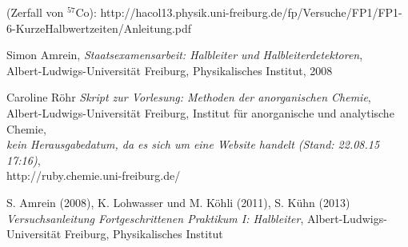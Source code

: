 \documentclass[12pt]{article}
\begin{document}
\newpage
\listoffigures


\newpage
\thispagestyle{empty}
\begin{thebibliography}{9}

 (Zerfall von $^{57}$Co): http://hacol13.physik.uni-freiburg.de/fp/Versuche/FP1/FP1-6-KurzeHalbwertzeiten/Anleitung.pdf
  
  	Simon Amrein,
  	\emph{Staatsexamensarbeit: Halbleiter und Halbleiterdetektoren},\\
  	Albert-Ludwigs-Universität Freiburg,
  	Physikalisches Institut,
  	2008

	Caroline Röhr
	\emph{Skript zur Vorlesung: Methoden der anorganischen Chemie},\\
	Albert-Ludwigs-Universität Freiburg,
	Institut für anorganische und analytische Chemie,\\
	\emph{kein Herausgabedatum, da es sich um eine Website handelt (Stand: 22.08.15 17:16)},\\
	http://ruby.chemie.uni-freiburg.de/

  	S. Amrein (2008), K. Lohwasser und M. Köhli (2011), S. Kühn (2013)
  	\emph{Versuchsanleitung Fortgeschrittenen Praktikum I: Halbleiter},
  	Albert-Ludwigs-Universität Freiburg,
  	Physikalisches Institut
  
  

\end{thebibliography}
\end{document}

